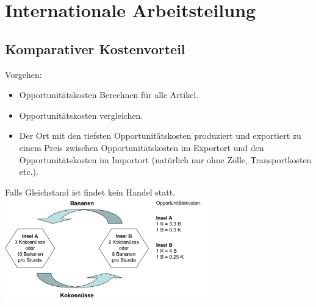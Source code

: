 \section{Internationale Arbeitsteilung}
\subsection{Komparativer Kostenvorteil}
\begin{multicols}{2}
	Vorgehen:
	\begin{itemize}
		\item Opportunitätskosten Berechnen für alle Artikel.
		\item Opportunitätskosten vergleichen.
		\item Der Ort mit den tiefsten Opportunitätskosten produziert und
		exportiert zu einem Preis zwischen Opportunitätskosten im
		Exportort und den Opportunitätskosten im Importort (natürlich nur ohne
		Zölle, Transportkosten etc.).
	\end{itemize}
	Falls Gleichstand ist findet kein Handel statt.
	\includegraphics[width=9cm]{images/h03f07.png}
\end{multicols}

